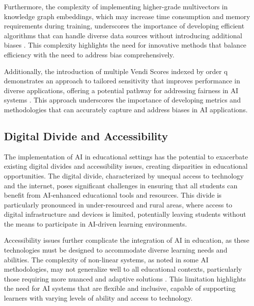 Furthermore, the complexity of implementing higher-grade multivectors in knowledge graph embeddings, which may increase time consumption and memory requirements during training, underscores the importance of developing efficient algorithms that can handle diverse data sources without introducing additional biases \cite{hsu2023whatsleftconceptgrounding}. This complexity highlights the need for innovative methods that balance efficiency with the need to address bias comprehensively.



Additionally, the introduction of multiple Vendi Scores indexed by order q demonstrates an approach to tailored sensitivity that improves performance in diverse applications, offering a potential pathway for addressing fairness in AI systems \cite{pasarkar2024cousinsvendiscorefamily}. This approach underscores the importance of developing metrics and methodologies that can accurately capture and address biases in AI applications.





\subsection{Digital Divide and Accessibility} \label{subsec:Digital Divide and Accessibility}



The implementation of AI in educational settings has the potential to exacerbate existing digital divides and accessibility issues, creating disparities in educational opportunities. The digital divide, characterized by unequal access to technology and the internet, poses significant challenges in ensuring that all students can benefit from AI-enhanced educational tools and resources. This divide is particularly pronounced in under-resourced and rural areas, where access to digital infrastructure and devices is limited, potentially leaving students without the means to participate in AI-driven learning environments.



Accessibility issues further complicate the integration of AI in education, as these technologies must be designed to accommodate diverse learning needs and abilities. The complexity of non-linear systems, as noted in some AI methodologies, may not generalize well to all educational contexts, particularly those requiring more nuanced and adaptive solutions \cite{vashishtha2019restoringchaosusingdeep}. This limitation highlights the need for AI systems that are flexible and inclusive, capable of supporting learners with varying levels of ability and access to technology.



